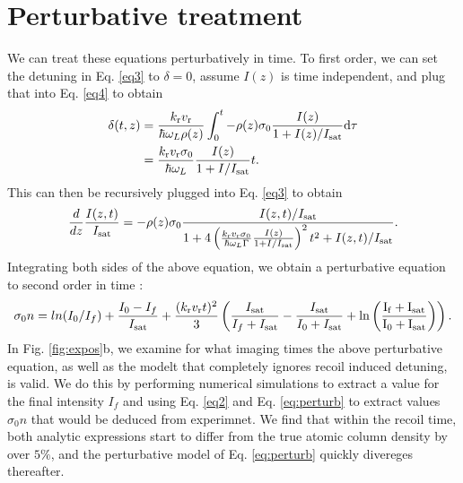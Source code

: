 \section{Perturbative treatment}
We can treat these equations perturbatively in time. To first order, we can set the detuning in Eq. \ref{eq3} to $\delta=0$, assume $I(z)$ is time independent, and plug that into Eq. \ref{eq4} to obtain 
\begin{align}
\delta(t,z)&=\frac{ k_{\rm{r}} v_{\rm{r}}}{\hbar\omega_L\rho(z)}\int_0^t-\rho(z)\sigma_0\frac{I(z)}{1+I(z)/I_{\rm{sat}}}\mathrm{d}\tau \\
&=\frac{ k_{\rm{r}} v_{\rm{r}}\sigma_0}{\hbar\omega_L}\frac{I(z)}{1+I/I_{\rm{sat}}}t.
\label{eq:recursive}
\end{align} 
This can then be recursively plugged into Eq. \ref{eq3} to obtain
\begin{equation}
\frac{d}{dz}\frac{I(z,t)}{I_{\rm{sat}}}=-\rho(z)\sigma_0\frac{I(z,t)/I_{\rm{sat}}}{1+4\left(\frac{ k_{\rm{r}} v_{\rm{r}}\sigma_0}{\hbar\omega_L\Gamma}\frac{I(z)}{1+I/I_{\rm{sat}}}\right)^2 t^2 +I(z,t)/I_{\rm{sat}}}.
\end{equation}
Integrating both sides of the above equation, we obtain a perturbative equation to second order in time \cite{LJLthesis}:
\begin{equation}
\sigma_0 n = ln(I_0/I_f) + \frac{I_0-I_f}{I_{\rm{sat}}} + \frac{ (k_{\rm{r}} v_{\rm{r}} t)^2}{3}\left(\frac{I_{\rm{sat}}}{I_f+I_{\rm{sat}}}-\frac{I_{\rm{sat}}}{I_0+I_{\rm{sat}}} +\rm{ ln}\left(\frac{I_f+I_{\rm{sat}}}{I_0+I_{\rm{sat}}}\right)\right).
\label{eq:perturb}
\end{equation}
In Fig. \ref{fig:expos}b, we examine for what imaging times the above perturbative equation, as well as the modelt that completely ignores recoil induced detuning, is valid. We do this by performing numerical simulations to extract a value for the final intensity $I_f$ and using Eq. \ref{eq2} and Eq. \ref{eq:perturb} to extract values $\sigma_0 n$ that would be deduced from experimnet. We find that within the recoil time, both analytic expressions start to differ from the true atomic column density by over $5\%$, and the perturbative model of Eq. \ref{eq:perturb} quickly divereges thereafter. 

